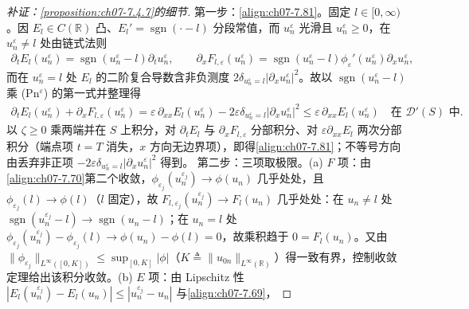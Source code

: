 ﻿\documentclass[../../main.tex]{subfiles}%
\begin{document}
\begin{proof}[补证：\cref{proposition:ch07-7.4.7}的细节]
第一步：\eqref{align:ch07-7.81}。固定 $l\in[0,\infty)$。因 $E_l\in C(\mathbb{R})$ 凸、$E_l'=\operatorname{sgn}(\cdot-l)$ 分段常值，而 $u_n^\varepsilon$ 光滑且 $u_n^\varepsilon\geqslant0$，在 $u_n^\varepsilon\neq l$ 处由链式法则
\begin{align*}
\partial_tE_l(u_n^\varepsilon)=\operatorname{sgn}(u_n^\varepsilon-l)\partial_tu_n^\varepsilon,\qquad
\partial_xF_{l,\varepsilon}(u_n^\varepsilon)=\operatorname{sgn}(u_n^\varepsilon-l)\phi_\varepsilon'(u_n^\varepsilon)\partial_xu_n^\varepsilon,
\end{align*}
而在 $u_n^\varepsilon=l$ 处 $E_l$ 的二阶复合导数含非负测度 $2\delta_{u_n^\varepsilon=l}|\partial_xu_n^\varepsilon|^2$。故以 $\operatorname{sgn}(u_n^\varepsilon-l)$ 乘 (Pn$^\varepsilon$) 的第一式并整理得
\begin{align*}
\partial_tE_l(u_n^\varepsilon)+\partial_xF_{l,\varepsilon}(u_n^\varepsilon)
=\varepsilon\,\partial_{xx}E_l(u_n^\varepsilon)-2\varepsilon\delta_{u_n^\varepsilon=l}|\partial_xu_n^\varepsilon|^2
\leqslant\varepsilon\,\partial_{xx}E_l(u_n^\varepsilon)\quad\text{在 }\mathscr{D}'(S)\text{ 中}.
\end{align*}
以 $\zeta\geqslant0$ 乘两端并在 $S$ 上积分，对 $\partial_tE_l$ 与 $\partial_xF_{l,\varepsilon}$ 分部积分、对 $\varepsilon\partial_{xx}E_l$ 两次分部积分（端点项 $t=T$ 消失，$x$ 方向无边界项），即得\eqref{align:ch07-7.81}；不等号方向由丢弃非正项 $-2\varepsilon\delta_{u_n^\varepsilon=l}|\partial_xu_n^\varepsilon|^2$ 得到。
第二步：三项取极限。(a) $F$ 项：由\eqref{align:ch07-7.70}第二个收敛，$\phi_{\varepsilon_j}(u_n^{\varepsilon_j})\to\phi(u_n)$ 几乎处处，且 $\phi_{\varepsilon_j}(l)\to\phi(l)$（$l$ 固定），故 $F_{l,\varepsilon_j}(u_n^{\varepsilon_j})\to F_l(u_n)$ 几乎处处：在 $u_n\neq l$ 处 $\operatorname{sgn}(u_n^{\varepsilon_j}-l)\to\operatorname{sgn}(u_n-l)$；在 $u_n=l$ 处 $\phi_{\varepsilon_j}(u_n^{\varepsilon_j})-\phi_{\varepsilon_j}(l)\to\phi(u_n)-\phi(l)=0$，故乘积趋于 $0=F_l(u_n)$。又由 $\|\phi_{\varepsilon_j}\|_{L^\infty([0,K])}\leqslant\sup_{[0,K]}|\phi|$（$K\triangleq\|u_{0n}\|_{L^\infty(\mathbb{R})}$）得一致有界，控制收敛定理给出该积分收敛。(b) $E$ 项：由 Lipschitz 性 $|E_l(u_n^{\varepsilon_j})-E_l(u_n)|\leqslant|u_n^{\varepsilon_j}-u_n|$ 与\eqref{align:ch07-7.69}，

\end{proof}
\end{document}
